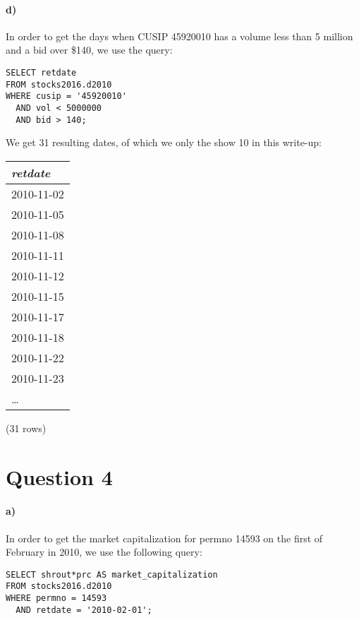 \documentclass[]{article}
\let\oldparagraph\paragraph
\renewcommand{\paragraph}[1]{\oldparagraph{#1}\mbox{}}
\begin{document}
\paragraph{d)}
In order to get the days when CUSIP 45920010 has a volume less than 5 million and a bid over \$140, we use the query:

\color{blue}
\begin{verbatim}
SELECT retdate
FROM stocks2016.d2010
WHERE cusip = '45920010'
  AND vol < 5000000
  AND bid > 140;
\end{verbatim}
\color{black}

We get 31 resulting dates, of which we only the show 10 in this write-up:

\begin{center}
\begin{tabular}{|l|}
\hline
\textit{retdate} \\
\hline
2010-11-02 \\
2010-11-05 \\
2010-11-08 \\
2010-11-11 \\
2010-11-12 \\
2010-11-15 \\
2010-11-17 \\
2010-11-18 \\
2010-11-22 \\
2010-11-23 \\
\ldots \\
\hline
\end{tabular}

\noindent (31 rows) \\
\end{center}


\section*{Question 4}
\paragraph{a)}
In order to get the market capitalization for permno 14593 on the first of February in 2010, we use the following query:

\color{blue}
\begin{verbatim}
SELECT shrout*prc AS market_capitalization
FROM stocks2016.d2010
WHERE permno = 14593
  AND retdate = '2010-02-01';
\end{verbatim}
\color{black}
\end{document}
